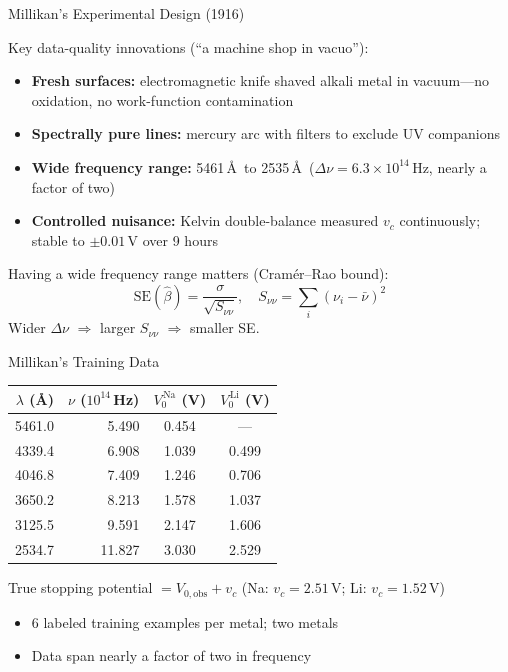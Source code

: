\documentclass[aspectratio=169]{beamer}
\begin{document}
\begin{frame}{Millikan's Experimental Design (1916)}

Key data-quality innovations (``a machine shop in vacuo''):

\begin{itemize}
  \item \textbf{Fresh surfaces:} electromagnetic knife shaved alkali
    metal in vacuum---no oxidation, no work-function contamination
  \item \textbf{Spectrally pure lines:} mercury arc with filters to
    exclude UV companions
  \item \textbf{Wide frequency range:} 5461\,\AA\ to 2535\,\AA\
    ($\Delta\nu = 6.3\times10^{14}$\,Hz, nearly a factor of two)
  \item \textbf{Controlled nuisance:} Kelvin double-balance measured
    $v_c$ continuously; stable to $\pm 0.01$\,V over 9 hours
\end{itemize}

\medskip
Having a  wide frequency range matters (Cram\'er--Rao bound):
\[
  \mathrm{SE}(\hat\beta) = \frac{\sigma}{\sqrt{S_{\nu\nu}}},
  \quad S_{\nu\nu} = \sum_i(\nu_i - \bar\nu)^2
\]
Wider $\Delta\nu$ $\Rightarrow$ larger $S_{\nu\nu}$ $\Rightarrow$ smaller SE.

\end{frame}

\begin{frame}{Millikan's Training Data}

\begin{center}
\begin{tabular}{rrcc}
\toprule
$\lambda$ (\AA) & $\nu$ ($10^{14}$\,Hz)
  & $V_0^{\,\mathrm{Na}}$ (V) & $V_0^{\,\mathrm{Li}}$ (V) \\
\midrule
5461.0 &  5.490 & 0.454  & ---   \\
4339.4 &  6.908 & 1.039  & 0.499 \\
4046.8 &  7.409 & 1.246  & 0.706 \\
3650.2 &  8.213 & 1.578  & 1.037 \\
3125.5 &  9.591 & 2.147  & 1.606 \\
2534.7 & 11.827 & 3.030  & 2.529 \\
\bottomrule
\end{tabular}
\end{center}

\medskip
True stopping potential $= V_{0,\text{obs}} + v_c$
\hspace{1em} (Na: $v_c = 2.51$\,V;\; Li: $v_c = 1.52$\,V)

\medskip
\begin{itemize}
  \item 6 labeled training examples per metal; two metals
  \item Data span nearly a factor of two in frequency
\end{itemize}

\end{frame}
\end{document}

